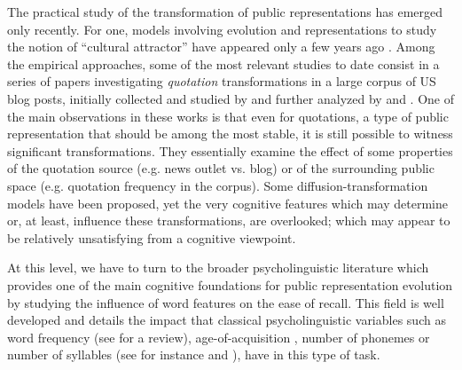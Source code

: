 The practical study of the transformation of public representations has emerged only recently.
For one, models involving evolution and representations to study the notion of ``cultural attractor'' have appeared only a few years ago \citep{Claidiere07}.
Among the empirical approaches, some of the most relevant studies to date consist in a series of papers investigating \emph{quotation} transformations in a large corpus of US blog posts, initially collected and studied by \citet{Leskovec09} and further analyzed by \citet{Simmons11} and \citet{omod-mult}.
One of the main observations in these works is that even for quotations, a type of public representation that should be among the most stable, it is still possible to witness significant transformations. They essentially examine the effect of some properties of the quotation source (\hbox{e.g.} news outlet {vs.} blog) or of the surrounding public space (\hbox{e.g.} quotation frequency in the corpus). Some diffusion-transformation models have been proposed, yet the very cognitive features which may determine or, at least, influence these transformations, are overlooked; which may appear to be relatively unsatisfying from a cognitive viewpoint.


At this level, we have to turn to the broader psycholinguistic literature which provides one of the main cognitive foundations for public representation evolution by studying the influence of word features on the ease of recall.
This field is well developed and details the impact that classical psycholinguistic variables such as word frequency (see \citet{Yonelinas02} for a review), age-of-acquisition \citep{Zevin02}, number of phonemes or number of syllables (see for instance \citet{Rey98} and \citet{nick-diss}), have in this type of task.

